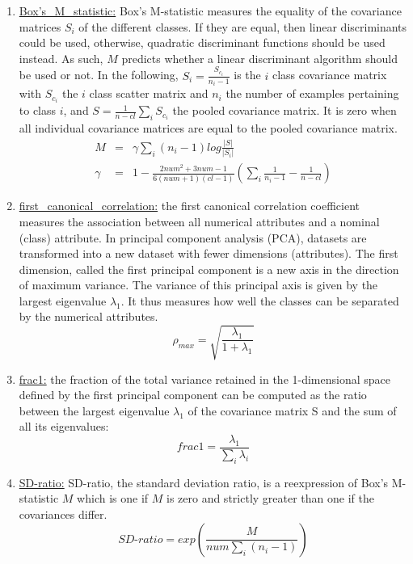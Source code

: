 \documentclass[a4paper,12pt, english]{article}
\begin{document}
\begin{enumerate}
\begin{enumerate}
\begin{enumerate}
\begin{enumerate}
				\item \underline{Box's\_M\_statistic:} Box's M-statistic measures the equality of the covariance matrices $S_{i}$ of the different classes. If they are equal, then linear discriminants could be used, otherwise, quadratic discriminant functions should be used instead. As such, $M$ predicts whether a linear discriminant algorithm should be used or not. In the following, $S_{i}=\frac{S_{c_{i}}}{n_{i}-1}$ is the $i$ class covariance matrix with $S_{c_{i}}$ the $i$ class scatter matrix and $n_{i}$ the number of examples pertaining to class $i$, and $S=\frac{1}{n-cl}\sum_{i}S_{c_{i}}$ the pooled covariance matrix. It is zero when all individual covariance matrices are equal to the pooled covariance matrix. \begin{eqnarray} M&=&\gamma\sum_{i}(n_{i}-1)log\frac{|S|}{|S_{i}|} \\ \gamma&=&1-\frac{2num^{2}+3num-1}{6(num+1)(cl-1)}(\sum_{i}\frac{1}{n_{i}-1}-\frac{1}{n-cl}) \end{eqnarray}
				\item \underline{first\_canonical\_correlation:}  the first canonical correlation coefficient measures the association between all numerical attributes and a nominal (class) attribute. In principal component analysis (PCA), datasets are transformed into a new dataset with fewer dimensions (attributes). The first dimension, called the first principal component is a new axis in the direction of maximum variance. The variance of this principal axis is given by the largest eigenvalue $\lambda_{1}$. It thus measures how well the classes can be separated by the numerical attributes. \begin{equation} \rho_{max}=\sqrt{\frac{\lambda_{1}}{1+\lambda_{1}}} \end{equation}
				\item \underline{frac1:} the fraction of the total variance retained in the 1-dimensional space defined by the first principal component can be computed as the ratio between the largest eigenvalue $\lambda_{1}$ of the covariance matrix S and the sum of all its eigenvalues: \begin{equation} frac1=\frac{\lambda_{1}}{\sum_{i}\lambda_{i}} \end{equation}
				\item \underline{SD-ratio:} SD-ratio, the standard deviation ratio, is a reexpression of Box's M-statistic $M$ which is one if $M$ is zero and strictly greater than one if the covariances differ. \begin{equation} SD\mbox{-}ratio=exp(\frac{M}{num\sum_{i}(n_{i}-1)}) \end{equation}

\end{enumerate}
\end{enumerate}
\end{enumerate}
\end{enumerate}
\end{document}
